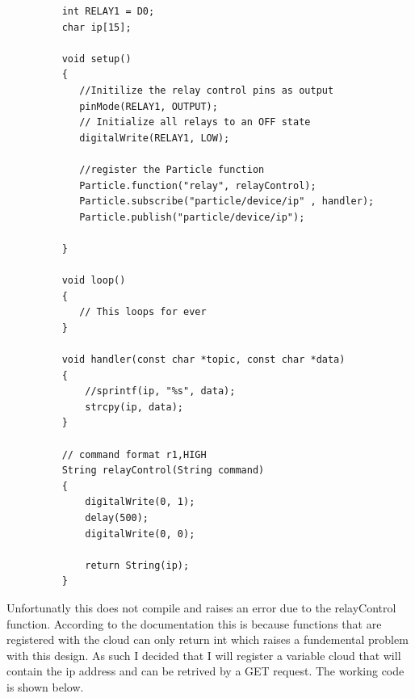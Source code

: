\documentclass{article}
\begin{document}
\begin{figure}[H]
    \begin{lstlisting}
    int RELAY1 = D0;
    char ip[15];

    void setup()
    {
       //Initilize the relay control pins as output
       pinMode(RELAY1, OUTPUT);
       // Initialize all relays to an OFF state
       digitalWrite(RELAY1, LOW);

       //register the Particle function
       Particle.function("relay", relayControl);
       Particle.subscribe("particle/device/ip" , handler);
       Particle.publish("particle/device/ip");

    }

    void loop()
    {
       // This loops for ever
    }

    void handler(const char *topic, const char *data)
    {
        //sprintf(ip, "%s", data);
        strcpy(ip, data);
    }

    // command format r1,HIGH
    String relayControl(String command)
    {
        digitalWrite(0, 1);
        delay(500);
        digitalWrite(0, 0);

        return String(ip);
    }
    \end{lstlisting}
\end{figure}

Unfortunatly this does not compile and raises an error due to the relayControl function.
According to the documentation this is because functions that are registered with the
cloud can only return int which raises a fundemental problem with this design. As such
I decided that I will register a variable cloud that will contain the ip address and can
be retrived by a GET request. The working code is shown below.
\end{document}
